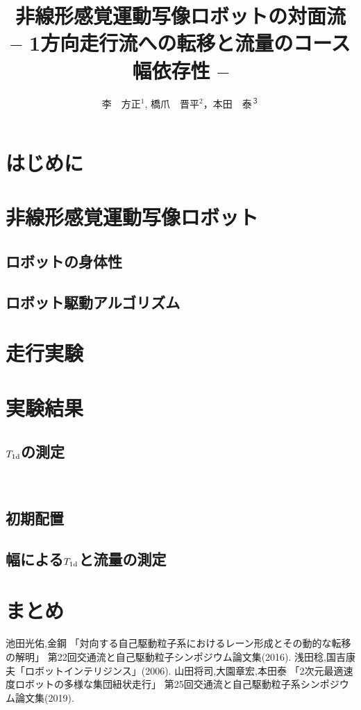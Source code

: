 \documentclass[twocolumn]{jarticle} %
\title{%
非線形感覚運動写像ロボットの対面流\\
{\Large -- 1方向走行流への転移と流量のコース幅依存性 --}
}
\author{%
李　方正$^1$, 橋爪　晋平$^2$，本田　泰$^３$
}
\affiliation{%
$^1$ 室蘭工業大学大学院　工学研究科　情報電子工学系専攻\\
$^2$ 室蘭工業大学　工学部　情報電子工学系学科\\
$^3$ 室蘭工業大学大学院　しくみ解明系領域
}
\begin{document}
\maketitle

\section{はじめに}
   
\section{非線形感覚運動写像ロボット}
\subsection{ロボットの身体性}
   
\subsection{ロボット駆動アルゴリズム}
   
\section{走行実験}
   
\section{実験結果}
\subsection{$T_{\rm 1d}$の測定}
　　
\subsection{初期配置}
   
\subsection{幅による$T_{\rm 1d}$と流量の測定}
   
\section{まとめ}
   

\begin{thebibliography}{99}
 池田光佑,金鋼
「対向する自己駆動粒子系におけるレーン形成とその動的な転移の解明」
第22回交通流と自己駆動粒子シンポジウム論文集(2016).
 浅田稔,国吉康夫「ロボットインテリジンス」(2006).
 山田将司,大園章宏,本田泰
「2次元最適速度ロボットの多様な集団紐状走行」
第25回交通流と自己駆動粒子系シンポジウム論文集(2019).
\end{thebibliography}
\end{document}
